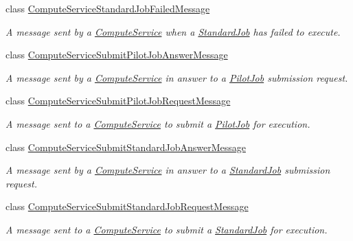 \begin{DoxyCompactItemize}
class \hyperlink{classwrench_1_1_compute_service_standard_job_failed_message}{Compute\+Service\+Standard\+Job\+Failed\+Message}
\begin{DoxyCompactList}\small\item\em A message sent by a \hyperlink{classwrench_1_1_compute_service}{Compute\+Service} when a \hyperlink{classwrench_1_1_standard_job}{Standard\+Job} has failed to execute. \end{DoxyCompactList}\item 
class \hyperlink{classwrench_1_1_compute_service_submit_pilot_job_answer_message}{Compute\+Service\+Submit\+Pilot\+Job\+Answer\+Message}
\begin{DoxyCompactList}\small\item\em A message sent by a \hyperlink{classwrench_1_1_compute_service}{Compute\+Service} in answer to a \hyperlink{classwrench_1_1_pilot_job}{Pilot\+Job} submission request. \end{DoxyCompactList}\item 
class \hyperlink{classwrench_1_1_compute_service_submit_pilot_job_request_message}{Compute\+Service\+Submit\+Pilot\+Job\+Request\+Message}
\begin{DoxyCompactList}\small\item\em A message sent to a \hyperlink{classwrench_1_1_compute_service}{Compute\+Service} to submit a \hyperlink{classwrench_1_1_pilot_job}{Pilot\+Job} for execution. \end{DoxyCompactList}\item 
class \hyperlink{classwrench_1_1_compute_service_submit_standard_job_answer_message}{Compute\+Service\+Submit\+Standard\+Job\+Answer\+Message}
\begin{DoxyCompactList}\small\item\em A message sent by a \hyperlink{classwrench_1_1_compute_service}{Compute\+Service} in answer to a \hyperlink{classwrench_1_1_standard_job}{Standard\+Job} submission request. \end{DoxyCompactList}\item 
class \hyperlink{classwrench_1_1_compute_service_submit_standard_job_request_message}{Compute\+Service\+Submit\+Standard\+Job\+Request\+Message}
\begin{DoxyCompactList}\small\item\em A message sent to a \hyperlink{classwrench_1_1_compute_service}{Compute\+Service} to submit a \hyperlink{classwrench_1_1_standard_job}{Standard\+Job} for execution. \end{DoxyCompactList}\item 

\end{DoxyCompactItemize}
